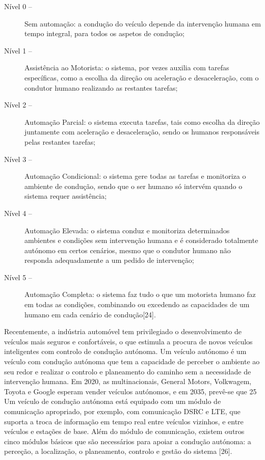 \documentclass[a4paper,10pt]{texRel}
\begin{document}
\begin{description}
\item[Nível 0 –] Sem automação: a condução do veículo depende da intervenção humana em tempo integral, para todos os aspetos de condução;  
\item[Nível 1 –] Assistência ao Motorista: o sistema, por vezes auxilia com tarefas específicas, como a escolha da direção ou aceleração e desaceleração, com o condutor humano realizando as restantes tarefas;
\item[Nível 2 –] Automação Parcial: o sistema executa tarefas, tais como escolha da direção juntamente com aceleração e desaceleração, sendo os humanos responsáveis pelas restantes tarefas;
\item[Nível 3 –] Automação Condicional: o sistema gere todas as tarefas e monitoriza o ambiente de condução, sendo que o ser humano só intervém quando o sistema requer assistência;
\item[Nível 4 –] Automação Elevada: o sistema conduz e monitoriza determinados ambientes e condições sem intervenção humana e é considerado totalmente autónomo em certos cenários, mesmo que o condutor humano não responda adequadamente a um pedido de intervenção;
\item[Nível 5 –] Automação Completa: o sistema faz tudo o que um motorista humano faz em todas as condições, combinando ou excedendo as capacidades de um humano em cada cenário de condução[24].
\end{description}
 Recentemente, a indústria automóvel tem privilegiado o desenvolvimento de veículos mais seguros e confortáveis, o que estimula a procura de novos veículos inteligentes com controlo de condução autónoma.  
Um veículo autónomo é um veículo com condução autónoma que tem a capacidade de perceber o ambiente ao seu redor e realizar o controlo e planeamento do caminho sem a necessidade de intervenção humana.  
Em 2020, as multinacionais, General Motors, Volkwagem, Toyota e Google esperam vender veículos autónomos, e em 2035, prevê-se que 25%
Um veículo de condução autónoma está equipado com um módulo de comunicação apropriado, por exemplo, com comunicação DSRC e LTE, que suporta a troca de informação em tempo real entre veículos vizinhos, e entre veículos e estações de base. Além do módulo de comunicação, existem outros cinco módulos básicos que são necessários para apoiar a condução autónoma: a perceção, a localização, o planeamento, controlo e gestão do sistema [26].
\end{document}
